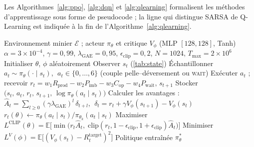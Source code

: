 \documentclass[11pt,a4paper]{article}
\begin{document}
Les Algorithmes~\ref{alg:ppo}, \ref{alg:dqn} et \ref{alg:qlearning} formalisent les méthodes d'apprentissage sous forme de pseudocode ; la ligne qui distingue SARSA de Q-Learning est indiquée à la fin de l'Algorithme~\ref{alg:qlearning}.

\begin{algorithm}[H]
\caption{PPO pour le dispatching de camions miniers}
\label{alg:ppo}
\begin{algorithmic}[1]
\Require Environnement minier $\mathcal{E}$ ; acteur $\pi_\theta$ et critique $V_\phi$ (MLP $[128,128]$, Tanh)
\Require $\alpha{=}3{\times}10^{-4}$, $\gamma{=}0{,}99$, $\lambda_{\text{GAE}}{=}0{,}95$, $\epsilon_{\text{clip}}{=}0{,}2$, $N{=}1024$, $T_{\max}{=}2{\times}10^6$
\State Initialiser $\theta$, $\phi$ aléatoirement
   
    \State Observer $s_t$ (\cref{tab:state})
    \State Échantillonner $a_t \sim \pi_\theta(\cdot\mid s_t)$, $\;a_t\in\{0,\ldots,6\}$ (couple pelle--déversement ou \textsc{wait})
    \State Exécuter $a_t$ ; recevoir $r_t = w_1 R_{\text{prod}} - w_2 P_{\text{imb}} - w_3 C_{\text{op}} - w_4 P_{\text{wait}}$, $s_{t+1}$
    \State Stocker $\bigl(s_t,\,a_t,\,r_t,\,s_{t+1},\,\log\pi_\theta(a_t\mid s_t)\bigr)$
  \EndFor
  \State Calculer les avantages : $\hat{A}_t = \sum_{l\geq 0}(\gamma\lambda_{\text{GAE}})^l\,\delta_{t+l}$,
         $\;\delta_t = r_t + \gamma V_\phi(s_{t+1}) - V_\phi(s_t)$
    \State $r_t(\theta)\leftarrow \pi_\theta(a_t\mid s_t)/\pi_{\theta_k}(a_t\mid s_t)$
    \State Maximiser $L^{\text{CLIP}}(\theta)=\mathbb{E}\bigl[\min\bigl(r_t\hat{A}_t,\;\mathrm{clip}(r_t,1{-}\epsilon_{\text{clip}},1{+}\epsilon_{\text{clip}})\hat{A}_t\bigr)\bigr]$
    \State Minimiser $L^{V}(\phi)=\mathbb{E}\bigl[(V_\phi(s_t)-R_t^{\text{target}})^2\bigr]$
  \EndFor
\EndFor
\Ensure Politique entraînée $\pi_\theta^*$
\end{algorithmic}
\end{algorithm}
\end{document}
